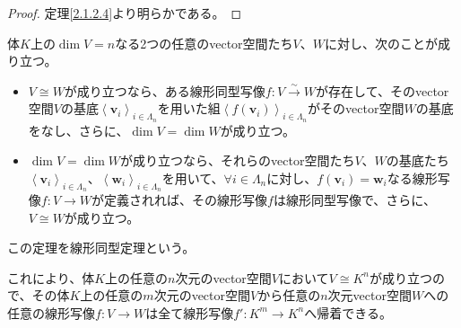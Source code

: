 \documentclass[dvipdfmx]{jsarticle}
\begin{document}
\begin{proof}
定理\ref{2.1.2.4}より明らかである。
\end{proof}
\begin{thm}[線形同型定理]\label{2.1.2.6}
体$K$上の$\dim V = n$なる2つの任意のvector空間たち$V$、$W$に対し、次のことが成り立つ。
\begin{itemize}
\item
  $V \cong W$が成り立つなら、ある線形同型写像$f:V\overset{\sim}{\rightarrow}W$が存在して、そのvector空間$V$の基底$\left\langle \mathbf{v}_{i} \right\rangle_{i \in \varLambda_{n}}$を用いた組$\left\langle f\left( \mathbf{v}_{i} \right) \right\rangle_{i \in \varLambda_{n}}$がそのvector空間$W$の基底をなし、さらに、$\dim V = \dim W$が成り立つ。
\item
  $\dim V = \dim W$が成り立つなら、それらのvector空間たち$V$、$W$の基底たち$\left\langle \mathbf{v}_{i} \right\rangle_{i \in \varLambda_{n}}$、$\left\langle \mathbf{w}_{i} \right\rangle_{i \in \varLambda_{n}}$を用いて、$\forall i \in \varLambda_{n}$に対し、$f\left( \mathbf{v}_{i} \right) = \mathbf{w}_{i}$なる線形写像$f:V \rightarrow W$が定義されれば、その線形写像$f$は線形同型写像で、さらに、$V \cong W$が成り立つ。
\end{itemize}
この定理を線形同型定理という。
\end{thm}\par
これにより、体$K$上の任意の$n$次元のvector空間$V$において$V \cong K^{n}$が成り立つので、その体$K$上の任意の$m$次元のvector空間$V$から任意の$n$次元vector空間$W$への任意の線形写像$f:V \rightarrow W$は全て線形写像$f':K^{m} \rightarrow K^{n}$へ帰着できる。
\end{document}
